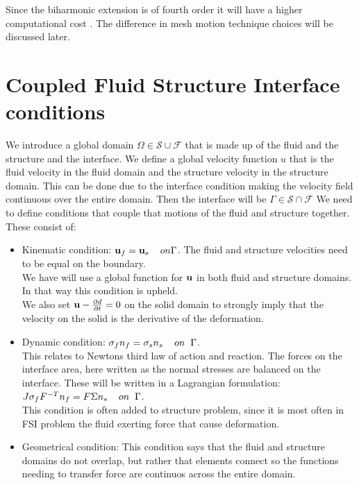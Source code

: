 Since the biharmonic extension is of fourth order it will have a higher computational cost \cite{Richter2016}. The difference in mesh motion technique choices will be discussed later.


\section{Coupled Fluid Structure Interface conditions}
We introduce a global domain $\Omega \in \mathcal{S} \cup \mathcal{F} $ that is made up of the fluid and the structure and the interface. We define a global velocity function $u$ that is the fluid velocity in the fluid domain and the structure velocity in the structure domain. This can be done due to the interface condition making the velocity field continuous over the entire domain. Then the interface will be $ \Gamma \in \mathcal{S} \cap \mathcal{F}  $  
We need to define conditions that couple that motions of the fluid and structure together. These consist of:

\begin{itemize}
\item Kinematic condition: $\bold{u}_f = \bold{u}_s  \hspace{4mm} on \Gamma$. The fluid and structure velocities need to be equal on the boundary. \\
We have will use a global function for $\bold{u}$ in both fluid and structure domains. In that way this condition is upheld.\\
We also set  $\bold{u} - \frac{\partial d}{\partial t}  = 0  $ on the solid domain to strongly imply that the velocity on the solid is the derivative of the deformation.  

\item Dynamic condition: $  \sigma_f n_f = \sigma_s n_s \hspace{4mm} on  \hspace{2mm}\Gamma   $. \\
	This relates to Newtons third law of action and reaction. The forces on the interface area, here written as the normal stresses are balanced on the interface. These will be written in a Lagrangian formulation: \\
	$J\sigma_f F^{-T} n_f = F\Sigma n_s \hspace{4mm} on  \hspace{2mm}\Gamma $. \\
	This condition is often added to structure problem, since it is most often in FSI problem the fluid exerting force that cause deformation.
\item Geometrical condition: This condition says that the fluid and structure domains do not overlap, but rather that elements connect so the functions needing to transfer force are continuos across the entire domain.
\end{itemize}

